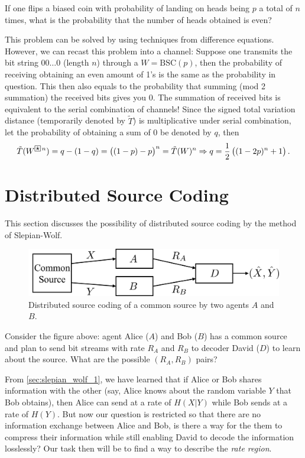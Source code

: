 \begin{example}
    If one flips a biased coin with probability of landing on heads being $p$ a total of $n$ times, what is the probability that the number of heads obtained is even?

    This problem can be solved by using techniques from difference equations. However, we can recast this problem into a channel: Suppose one transmits the bit string $00\ldots 0$ (length $n$) through a $W=\mathrm{BSC}(p)$, then the probability of receiving obtaining an even amount of 1's is the same as the probability in question. This then also equals to the probability that summing (mod 2 summation) the received bits gives you 0. The summation of received bits is equivalent to the serial combination of channels! Since the signed total variation distance (temporarily denoted by $\tilde{T}$) is multiplicative under serial combination, let the probability of obtaining a sum of 0 be denoted by $q$, then
    \begin{equation*}
        \tilde{T}(W^{\boxstar n}) = q - (1-q) = \left((1-p) - p\right)^n = \tilde{T}(W)^n \Rightarrow q = \frac{1}{2}\left((1-2p)^{n} + 1\right).
    \end{equation*}
\end{example}

\section{Distributed Source Coding}
This section discusses the possibility of distributed source coding by the method of Slepian-Wolf.

\begin{figure}[H]
    \centering
    \includegraphics[width=0.6\linewidth]{figures/w5_distr_src_coding.png}
    \caption{Distributed source coding of a common source by two agents $A$ and $B$.}
\end{figure}

Consider the figure above: agent Alice ($A$) and Bob ($B$) has a common source and plan to send bit streams with rate $R_A$ and $R_B$ to decoder David ($D$) to learn about the source. What are the possible $(R_A,R_B)$ pairs?

From \autoref{sec:slepian_wolf_1}, we have learned that if Alice or Bob shares information with the other (say, Alice knows about the random variable $Y$ that Bob obtains), then Alice can send at a rate of $H(X\vert Y)$ while Bob sends at a rate of $H(Y)$. But now our question is restricted so that there are no information exchange between Alice and Bob, is there a way for the them to compress their information while still enabling David to decode the information losslessly? Our task then will be to find a way to describe the \textit{rate region}.

